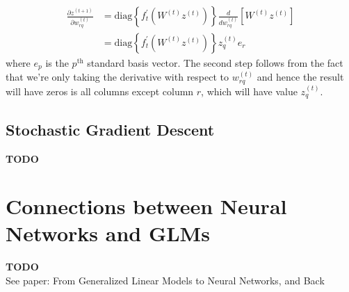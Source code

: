 \documentclass[12pt]{article}
\begin{document}
\begin{align*}
\frac{\partial z^{(t + 1)}}{\partial w_{rq}^{(t)}} &= \text{diag}\left\{f_{t}^\prime(W^{(t)}z^{(t)})\right\} \frac{d}{dw_{rq}^{(t)}} \left[W^{(t)} z^{(t)} \right]\\
							          &= \text{diag}\left\{f_{t}^\prime(W^{(t)}z^{(t)})\right\} z_q^{(t)} e_r
\end{align*}
where $e_p$ is the $p^\text{th}$ standard basis vector. The second step follows from the fact that we're only taking the derivative with respect to $w_{rq}^{(t)}$ and hence the result will have zeros
is all columns except column $r$, which will have value $z_q^{(t)}$.




\subsection{Stochastic Gradient Descent}
\textbf{TODO}


\section{Connections between Neural Networks and GLMs}
\textbf{TODO}\\
See paper: From Generalized Linear Models to Neural Networks, and Back
\end{document}
